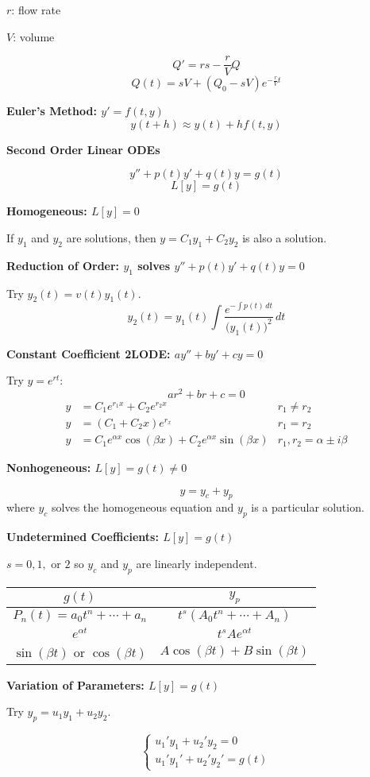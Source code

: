 \documentclass[10pt]{article}
\newcommand\sectionheading[1]{\begin{center}\large{\textbf{#1}}\end{center}\normalsize}
\newcommand\heading[1]{\smallskip\textbf{#1}\smallskip}
\begin{document}
\begin{multicols*}{3}
$r$: flow rate

$V$: volume

\[Q'=rs-\frac{r}{V}Q\]
\[Q(t)=sV+(Q_0-sV)e^{-\frac rVt}\]

\heading{Euler's Method: $y'=f(t,y)$}
\[y(t+h)\approx y(t)+hf(t,y)\]

\sectionheading{Second Order Linear ODEs}
\[y''+p(t)y'+q(t)y=g(t)\]
\[L[y]=g(t)\]

\heading{Homogeneous: $L[y]=0$}

If $y_1$ and $y_2$ are solutions, then $y=C_1y_1+C_2y_2$ is also a solution.

\heading{Reduction of Order: $y_1$ solves $y''+p(t)y'+q(t)y=0$}

Try $y_2(t)=v(t)y_1(t)$.
\[y_2(t)=y_1(t)\int\frac{e^{-\int p(t)\,dt}}{\bigl(y_1(t)\bigr)^2}\,dt\]

\heading{Constant Coefficient 2LODE: $ay''+by'+cy=0$}

Try $y=e^{rt}$:
\[ar^2+br+c=0\]
\begin{align*}
    y&=C_1e^{r_1x}+C_2e^{r_2x} &r_1\neq r_2 \\
    y&=(C_1+C_2x)e^{r_x} &r_1=r_2\\
    y&=C_1e^{\alpha x}\cos(\beta x)+C_2e^{\alpha x}\sin(\beta x) &r_1,r_2=\alpha\pm i\beta
\end{align*}

\heading{Nonhogeneous: $L[y]=g(t)\ne 0$}

\[y=y_c+y_p\]
where $y_c$ solves the homogeneous equation and $y_p$ is a particular solution.

\heading{Undetermined Coefficients: $L[y]=g(t)$}

$s=0,1,$ or $2$ so $y_c$ and $y_p$ are linearly independent.

\begin{tabular}{|c|c|}
    \hline
    $g(t)$ & $y_p$ \\
    \hline
    $P_n(t)=a_0t^n+\cdots+a_n$ & $t^s(A_0 t^n+\cdots+A_n)$ \\
    $e^{\alpha t}$ & $t^s Ae^{\alpha t}$ \\
    $\sin(\beta t)$ or $\cos(\beta t)$ & $A\cos(\beta t)+B\sin(\beta t)$ \\
    \hline 
\end{tabular}

\heading{Variation of Parameters: $L[y]=g(t)$}

Try $y_p=u_1 y_1 + u_2 y_2$.

\[\begin{cases}
    u_1' y_1 + u_2' y_2 = 0 \\
    u_1' y_1' + u_2' y_2' = g(t)
\end{cases}\]


\end{multicols*}
\end{document}
